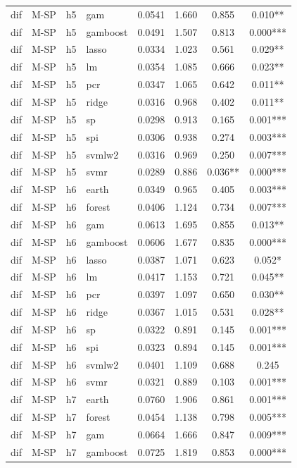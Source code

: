 \begin{ThreePartTable}
\begin{longtable}[t]{llclcccc}
dif & M-SP & h5 & gam & 0.0541 & 1.660 & 0.855 & 0.010**\\
dif & M-SP & h5 & gamboost & 0.0491 & 1.507 & 0.813 & 0.000***\\
dif & M-SP & h5 & lasso & 0.0334 & 1.023 & 0.561 & 0.029**\\
dif & M-SP & h5 & lm & 0.0354 & 1.085 & 0.666 & 0.023**\\
dif & M-SP & h5 & pcr & 0.0347 & 1.065 & 0.642 & 0.011**\\
dif & M-SP & h5 & ridge & 0.0316 & 0.968 & 0.402 & 0.011**\\
dif & M-SP & h5 & sp & 0.0298 & 0.913 & 0.165 & 0.001***\\
dif & M-SP & h5 & spi & 0.0306 & 0.938 & 0.274 & 0.003***\\
dif & M-SP & h5 & svmlw2 & 0.0316 & 0.969 & 0.250 & 0.007***\\
dif & M-SP & h5 & svmr & 0.0289 & 0.886 & 0.036** & 0.000***\\
\addlinespace
dif & M-SP & h6 & earth & 0.0349 & 0.965 & 0.405 & 0.003***\\
dif & M-SP & h6 & forest & 0.0406 & 1.124 & 0.734 & 0.007***\\
dif & M-SP & h6 & gam & 0.0613 & 1.695 & 0.855 & 0.013**\\
dif & M-SP & h6 & gamboost & 0.0606 & 1.677 & 0.835 & 0.000***\\
dif & M-SP & h6 & lasso & 0.0387 & 1.071 & 0.623 & 0.052*\\
dif & M-SP & h6 & lm & 0.0417 & 1.153 & 0.721 & 0.045**\\
dif & M-SP & h6 & pcr & 0.0397 & 1.097 & 0.650 & 0.030**\\
dif & M-SP & h6 & ridge & 0.0367 & 1.015 & 0.531 & 0.028**\\
dif & M-SP & h6 & sp & 0.0322 & 0.891 & 0.145 & 0.001***\\
dif & M-SP & h6 & spi & 0.0323 & 0.894 & 0.145 & 0.001***\\
dif & M-SP & h6 & svmlw2 & 0.0401 & 1.109 & 0.688 & 0.245\\
dif & M-SP & h6 & svmr & 0.0321 & 0.889 & 0.103 & 0.001***\\
\addlinespace
dif & M-SP & h7 & earth & 0.0760 & 1.906 & 0.861 & 0.001***\\
dif & M-SP & h7 & forest & 0.0454 & 1.138 & 0.798 & 0.005***\\
dif & M-SP & h7 & gam & 0.0664 & 1.666 & 0.847 & 0.009***\\
dif & M-SP & h7 & gamboost & 0.0725 & 1.819 & 0.853 & 0.000***\\

\end{longtable}
\end{ThreePartTable}
